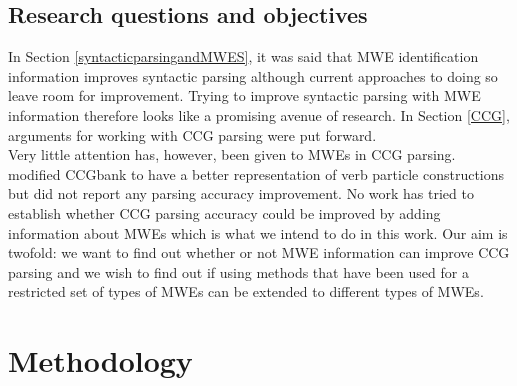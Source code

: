 \documentclass[output=paper]{LSP/langsci}
\begin{document}
                        \subsection{Research questions and objectives}
                        \label{relworkccl}
                        \indent  In Section \ref{syntacticparsingandMWES}, it was said that MWE identification information improves syntactic parsing although current approaches to doing so leave room for improvement. Trying to improve syntactic parsing with MWE information therefore looks like a promising avenue of research. In Section \ref{CCG}, arguments for working with CCG parsing were put forward.\\
                        \indent Very little attention has, however, been given to MWEs in CCG parsing. \citet{constablecurran} modified CCGbank to have a better representation of verb particle constructions but did not report any parsing accuracy improvement. No work has tried to establish whether CCG parsing accuracy could be improved by adding information about MWEs which is what we intend to do in this work. Our aim is twofold: we want to find out whether or not MWE information can improve CCG parsing and we wish to find out if using methods that have been used for a restricted set of types of MWEs can be extended to different types of MWEs. 

\section{Methodology}
\label{methodology}
\end{document}
